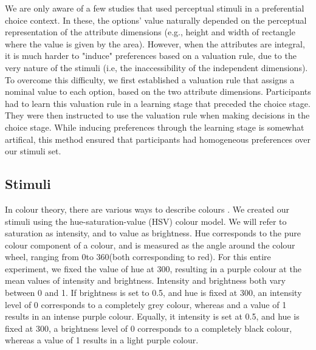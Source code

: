 \documentclass[11pt,a4paper]{article}
\begin{document}
We are only aware of a few studies that used perceptual stimuli in a preferential choice context. In these, the options' value naturally depended on the perceptual representation of the attribute dimensions (e.g., height and width of rectangle where the value is given by the area). However, when the attributes are integral, it is much harder to "induce" preferences based on a valuation rule, due to the very nature of the stimuli (i.e, the inaccessibility of the independent dimensions). To overcome this difficulty, we first established a valuation rule that assigns a nominal value to each option, based on the two attribute dimensions. Participants had to learn this valuation rule in a learning stage that preceded the choice stage. They were then instructed to use the valuation rule when making decisions in the choice stage. While inducing preferences through the learning stage is somewhat artifical, this method ensured that participants had homogeneous preferences over our stimuli set. 

\subsection{Stimuli}

In colour theory, there are various ways to describe colours \cite{Colourtheory}. We created our stimuli using the hue-saturation-value (HSV) colour model. We will refer to saturation as intensity, and to value as brightness. Hue corresponds to the pure colour component of a colour, and is measured as the angle around the colour wheel, ranging from 0\degree to 360\degree (both corresponding to red). For this entire experiment, we fixed the value of hue at 300\degree, resulting in a purple colour at the mean values of intensity and brightness. Intensity and brightness both vary between 0 and 1. If brightness is set to 0.5, and hue is fixed at 300\degree, an intensity level of 0 corresponds to a completely grey colour, whereas and a value of 1 results in an intense purple colour. Equally, it intensity is set at 0.5, and hue is fixed at 300\degree, a brightness level of 0 corresponds to a completely black colour, whereas a value of 1 results in a light purple colour.
\end{document}

